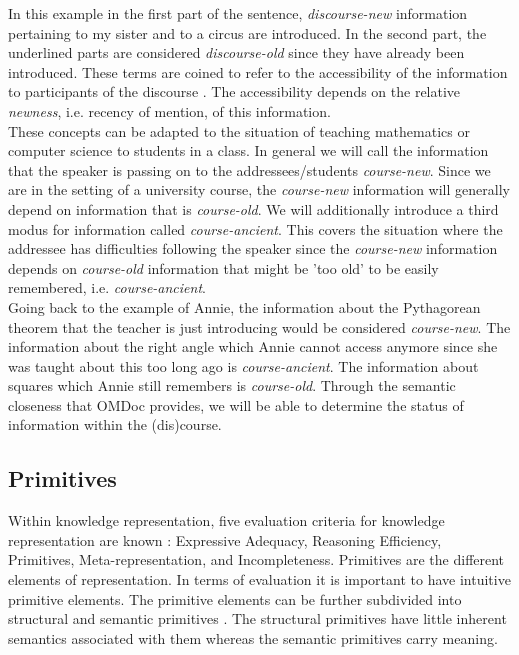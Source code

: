 \documentclass[twoside, 12pt]{article}
\begin{document}
In this example in the first part of the sentence, \textit{discourse-new} information pertaining to my sister and to a circus are introduced. In the second part, the underlined parts are considered \textit{discourse-old} since they have already been introduced. These terms are coined to refer to the accessibility of the information to participants of the discourse \cite{Newness:npentrel14}. The accessibility depends on the relative \textit{newness}, i.e. recency of mention, of this information.\\

These concepts can be adapted to the situation of teaching mathematics or computer science to students in a class. In general we will call the information that the speaker is passing on to the addressees/students \textit{course-new}. Since we are in the setting of a university course, the \textit{course-new} information will generally depend on information that is \textit{course-old}. We will additionally introduce a third modus for information called \textit{course-ancient}. This covers the situation where the addressee has difficulties following the speaker since the \textit{course-new} information depends on \textit{course-old} information that might be 'too old' to be easily remembered, i.e. \textit{course-ancient}.\\

Going back to the example of Annie, the information about the Pythagorean theorem that the teacher is just introducing would be considered \textit{course-new}. The information about the right angle which Annie cannot access anymore since she was taught about this too long ago is \textit{course-ancient}. The information about squares which Annie still remembers is \textit{course-old}. Through the semantic closeness that OMDoc provides, we will be able to determine the status of information within the (dis)course.\\

\subsection{Primitives}
\label{sec:primitives}

Within knowledge representation, five evaluation criteria for knowledge representation are known \cite{Kohlhase:Complog:base}: Expressive Adequacy, Reasoning Efficiency, Primitives, Meta-representation, and Incompleteness. Primitives are the different elements of representation. In terms of evaluation it is important to have intuitive primitive elements. The primitive elements can be further subdivided into structural and semantic primitives \cite{DBLP:dblp_conf/acl/Salveter80}. The structural primitives have little inherent semantics associated with them whereas the semantic primitives carry meaning.\\
\end{document}
